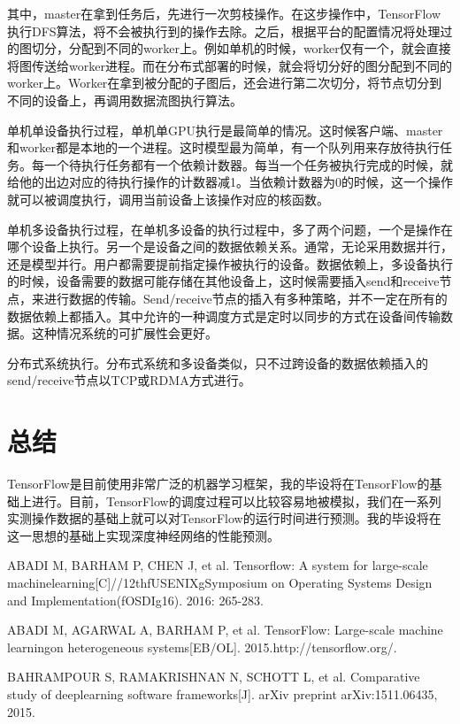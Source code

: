 其中，master在拿到任务后，先进行一次剪枝操作。在这步操作中，TensorFlow执行DFS算法，将不会被执行到的操作去除。之后，根据平台的配置情况将处理过的图切分，分配到不同的worker上。例如单机的时候，worker仅有一个，就会直接将图传送给worker进程。而在分布式部署的时候，就会将切分好的图分配到不同的worker上。Worker在拿到被分配的子图后，还会进行第二次切分，将节点切分到不同的设备上，再调用数据流图执行算法。

单机单设备执行过程，单机单GPU执行是最简单的情况。这时候客户端、master和worker都是本地的一个进程。这时模型最为简单，有一个队列用来存放待执行任务。每一个待执行任务都有一个依赖计数器。每当一个任务被执行完成的时候，就给他的出边对应的待执行操作的计数器减1。当依赖计数器为0的时候，这一个操作就可以被调度执行，调用当前设备上该操作对应的核函数。

单机多设备执行过程，在单机多设备的执行过程中，多了两个问题，一个是操作在哪个设备上执行。另一个是设备之间的数据依赖关系。通常，无论采用数据并行，还是模型并行。用户都需要提前指定操作被执行的设备。数据依赖上，多设备执行的时候，设备需要的数据可能存储在其他设备上，这时候需要插入send和receive节点，来进行数据的传输。Send/receive节点的插入有多种策略，并不一定在所有的数据依赖上都插入。其中允许的一种调度方式是定时以同步的方式在设备间传输数据。这种情况系统的可扩展性会更好。

分布式系统执行。分布式系统和多设备类似，只不过跨设备的数据依赖插入的send/receive节点以TCP或RDMA方式进行。

\section{总结}

TensorFlow是目前使用非常广泛的机器学习框架，我的毕设将在TensorFlow的基础上进行。目前，TensorFlow的调度过程可以比较容易地被模拟，我们在一系列实测操作数据的基础上就可以对TensorFlow的运行时间进行预测。我的毕设将在这一思想的基础上实现深度神经网络的性能预测。

\begin{translationbib}
    \item ABADI M, BARHAM P, CHEN J, et al. Tensorflow: A system for large-scale machinelearning[C]//12thfUSENIXgSymposium on Operating Systems Design and Implementation(fOSDIg16). 2016: 265-283.
    \item ABADI M, AGARWAL A, BARHAM P, et al. TensorFlow: Large-scale machine learningon heterogeneous systems[EB/OL]. 2015.http://tensorflow.org/.
    \item BAHRAMPOUR S, RAMAKRISHNAN N, SCHOTT L, et al. Comparative study of deeplearning software frameworks[J]. arXiv preprint arXiv:1511.06435, 2015.
\end{translationbib}